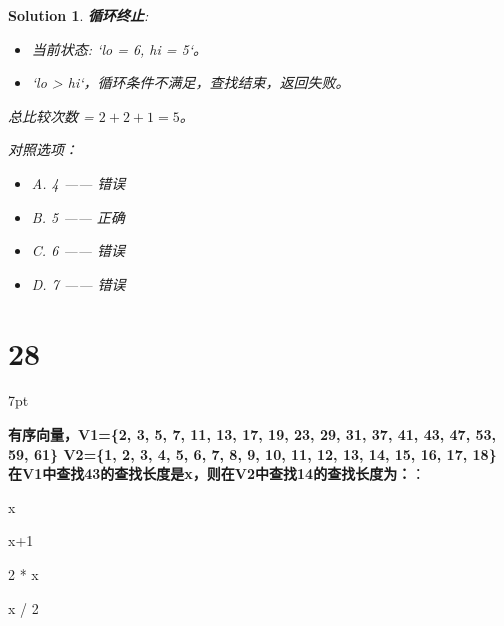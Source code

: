 \documentclass[UTF8]{report}
\newtheorem{solution}{Solution}
\theoremstyle{MyLineTheoremStyle} %
\theoremstyle{MyBlockTheoremStyle} %
\theoremstyle{MySubsubsectionStyle} %
\newenvironment{graybox}{%
        \def\FrameCommand{%
        \hspace{1pt}%
        {\color{gray}\small \vrule width 2pt}%
        {\color{graybox_color}\vrule width 4pt}%
        \colorbox{graybox_color}%
        }%
        \MakeFramed{\advance\hsize-\width\FrameRestore}%
        \noindent\hspace{-4.55pt}%
        \begin{adjustwidth}{}{7pt}%
        \vspace{2pt}\vspace{2pt}%
        }
        {%
        \vspace{2pt}\end{adjustwidth}\endMakeFramed%
        }
\begin{document}
\begin{solution}
\textbf{循环终止}:
\begin{itemize}
    \item 当前状态: `lo = 6, hi = 5`。
    \item `lo > hi`，循环条件不满足，查找结束，返回失败。
\end{itemize}

总比较次数 = $2 + 2 + 1 = 5$。

对照选项：
\begin{itemize}
    \item A. 4 —— 错误
    \item B. 5 —— 正确
    \item C. 6 —— 错误  
    \item D. 7 —— 错误
\end{itemize}
\end{solution}

\section*{28}

\begin{graybox}
\textbf{有序向量，V1=\{2, 3, 5, 7, 11, 13, 17, 19, 23, 29, 31, 37, 41, 43, 47, 53, 59, 61\} V2=\{1, 2, 3, 4, 5, 6, 7, 8, 9, 10, 11, 12, 13, 14, 15, 16, 17, 18\} 在V1中查找43的查找长度是x，则在V2中查找14的查找长度为：}：
\begin{circledenum}
    \item x
    \item x+1
    \item 2 * x
    \item x / 2
\end{circledenum}
\end{graybox}
\end{document}
